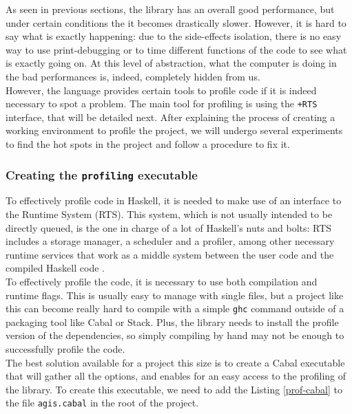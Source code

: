 As seen in previous sections, the library has an overall good performance, but
under certain conditions the it becomes drastically slower. However, it is hard
to say what is exactly happening: due to the side-effects isolation, there is
no easy way to use print-debugging or to time different functions of the code
to see what is exactly going on. At this level of abstraction, what the
computer is doing in the bad performances is, indeed, completely hidden from
us.\\

However, the language provides certain tools to profile code if it is indeed
necessary to spot a problem. The main tool for profiling is using the
\texttt{+RTS} interface, that will be detailed next. After explaining the
process of creating a working environment to profile the project, we will
undergo several experiments to find the hot spots in the project and follow a
procedure to fix it.\\

\subsubsection{Creating the \texttt{profiling} executable}

To effectively profile code in Haskell, it is needed to make use of an
interface to the Runtime System (RTS). This system, which is not usually
intended to be directly queued, is the one in charge of a lot of Haskell's nuts
and bolts: RTS includes a storage manager, a scheduler and a profiler, among
other necessary runtime services that work as a middle system between the user
code and the compiled Haskell code \cite{ghc}.\\

To effectively profile the code, it is necessary to use both compilation and
runtime flags. This is usually easy to manage with single files, but a project
like this can become really hard to compile with a simple \texttt{ghc} command
outside of a packaging tool like Cabal or Stack. Plus, the library needs to
install the profile version of the dependencies, so simply compiling by hand
may not be enough to successfully profile the code.\\

The best solution available for a project this size is to create a Cabal
executable that will gather all the options, and enables for an easy access to
the profiling of the library. To create this executable, we need to add the
Listing \ref{prof-cabal} to the file \texttt{agis.cabal} in the root of the
project.\\

